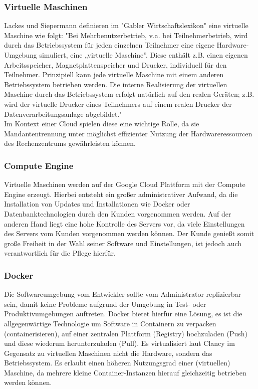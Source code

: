 \documentclass[pdftex,a4paper,abstracton,11pt,parskip=half,bibtotocnumbered]{scrartcl}
\begin{document}
		\subsubsection{Virtuelle Maschinen}
			Lackes und Siepermann definieren im "Gabler Wirtschaftslexikon" eine virtuelle Maschine wie folgt: "Bei Mehrbenutzerbetrieb, v.a. bei Teilnehmerbetrieb, wird durch
			das Betriebssystem für jeden einzelnen Teilnehmer eine eigene Hardware-Umgebung simuliert, eine „virtuelle Maschine”. Diese enthält z.B. einen eigenen Arbeitsspeicher, 
			Magnetplattenspeicher und Drucker, individuell für den Teilnehmer. Prinzipiell kann jede virtuelle Maschine mit einem anderen Betriebssystem betrieben
			werden. Die interne Realisierung der virtuellen Maschine durch das Betriebssystem erfolgt natürlich auf den realen Geräten; z.B. wird der virtuelle Drucker
			eines Teilnehmers auf einem realen Drucker der Datenverarbeitungsanlage abgebildet." \cite{lackes_siepermann_2018} \\
			Im Kontext einer Cloud spielen diese eine wichtige Rolle, da sie Mandantentrennung unter möglichst effizienter Nutzung der Hardwareressourcen
			des Rechenzentrums gewährleisten können.
		
		\subsubsection{Compute Engine}
			Virtuelle Maschinen werden auf der Google Cloud Plattform mit der Compute Engine erzeugt. Hierbei entsteht ein großer administrativer Aufwand, 
			da die Installation von Updates und Installationen wie Docker oder Datenbanktechnologien durch den Kunden vorgenommen werden. 
			Auf der anderen Hand liegt eine hohe Kontrolle des Servers vor, da viele Einstellungen des Servers vom Kunden vorgenommen werden können. Der Kunde
			genießt somit große Freiheit in der Wahl seiner Software und Einstellungen, ist jedoch auch verantwortlich für die Pflege hierfür.
	
		\subsubsection{Docker}
			Die Softwareumgebung vom Entwickler sollte vom Administrator replizierbar sein, damit keine Probleme aufgrund der Umgebung in Test- oder Produktivumgebungen 
			auftreten. Docker bietet hierfür eine Lösung, es ist die allgegenwärtige Technologie \cite[vgl.][S.40]{Venema_2021} um Software in Containern zu verpacken (containerisieren), 
			auf einer zentralen Plattform (Registry) hochzuladen (Push) und diese wiederum herunterzuladen (Pull). Es virtualisiert laut Clancy im Gegensatz zu virtuellen Maschinen
			nicht die Hardware, sondern das Betriebssystem. \cite[vgl.][]{clancy_2021} Es erlaubt einen höheren Nutzungsgrad einer (virtuellen) Maschine, da mehrere 
			kleine Container-Instanzen hierauf gleichzeitig betrieben werden können.
\end{document}
